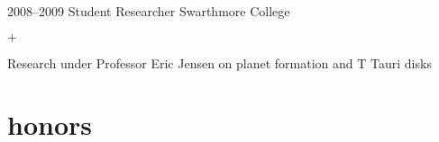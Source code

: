 \documentclass[]{luger-cv} %
\begin{document}
\begin{entrylist}

    \ifdefined \onepage \else
        \entry
        {2008--2009}
        {Student Researcher}
        {Swarthmore College}
        {%
            \vspace{-1em}
            \begin{list}{$+$}{\cvlist}
                \item Research under Professor Eric Jensen on planet formation and T Tauri disks
            \end{list}
        }
    \fi


\end{entrylist}




\section{honors}
\end{document}
